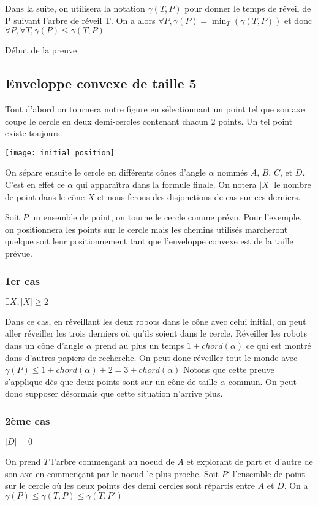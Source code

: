 Dans la suite, on utilisera la notation $\gamma(T, P)$ pour donner le temps de réveil de P suivant l'arbre de réveil T.
On a alors $\forall P, \gamma(P) = \min_T(\gamma(T,P))$
et donc $\forall P, \forall T, \gamma(P) \leq \gamma(T, P)$

Début de la preuve


\subsection{Enveloppe convexe de taille 5}

Tout d'abord on tournera notre figure en sélectionnant un point tel que son axe coupe le cercle en deux demi-cercles contenant chacun 2 points. Un tel point existe toujours.

\texttt{[image: initial\_position]}

On sépare ensuite le cercle en différents cônes d'angle $\alpha$ nommés $A$, $B$, $C$, et $D$. C'est en effet ce $\alpha$ qui apparaîtra dans la formule finale. On notera $|X|$ le nombre de point dans le cône $X$ et nous ferons des disjonctions de cas sur ces derniers.

Soit $P$ un ensemble de point, on tourne le cercle comme prévu. Pour l'exemple, on positionnera les points sur le cercle mais les chemins utilisés marcheront quelque soit leur positionnement tant que l'enveloppe convexe est de la taille prévue.

\subsubsection*{1er cas} $\exists X, |X| \geq 2$

Dans ce cas, en réveillant les deux robots dans le cône avec celui initial, on peut aller réveiller les trois derniers où qu'ils soient dans le cercle. Réveiller les robots dans un cône d'angle $\alpha$ prend au plus un temps $1 + chord(\alpha)$ ce qui est montré dans d'autres papiers de recherche.
On peut donc réveiller tout le monde avec $\gamma(P) \leq 1 + chord(\alpha) + 2 = 3 + chord(\alpha)$
Notons que cette preuve s'applique dès que deux points sont sur un cône de taille $\alpha$ commun. On peut donc supposer désormais que cette situation n'arrive plus.

\subsubsection*{2ème cas} $|D| = 0$

On prend $T$ l'arbre commençant au noeud de $A$ et explorant de part et d'autre de son axe en commençant par le noeud le plus proche.
Soit $P'$ l'ensemble de point sur le cercle où les deux points des demi cercles sont répartis entre $A$ et $D$.
On a $\gamma(P) \leq  \gamma(T, P) \leq \gamma(T, P')$


